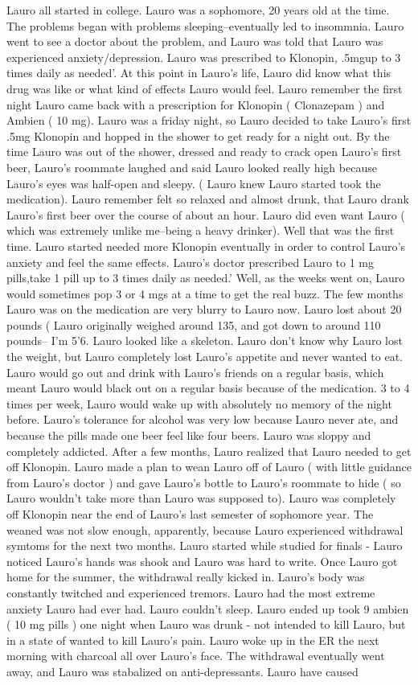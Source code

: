 \documentclass[12pt]{book}
\begin{document}
Lauro all started in college. Lauro was a sophomore, 20 years old at the time. The problems began with problems sleeping--eventually led to insommnia. Lauro went to see a doctor about the problem, and Lauro was told that Lauro was experienced anxiety/depression. Lauro was prescribed to Klonopin, .5mgup to 3 times daily as needed'. At this point in Lauro's life, Lauro did know what this drug was like or what kind of effects Lauro would feel. Lauro remember the first night Lauro came back with a prescription for Klonopin ( Clonazepam ) and Ambien ( 10 mg). Lauro was a friday night, so Lauro decided to take Lauro's first .5mg Klonopin and hopped in the shower to get ready for a night out. By the time Lauro was out of the shower, dressed and ready to crack open Lauro's first beer, Lauro's roommate laughed and said Lauro looked really high because Lauro's eyes was half-open and sleepy. ( Lauro knew Lauro started took the medication). Lauro remember felt so relaxed and almost drunk, that Lauro drank Lauro's first beer over the course of about an hour. Lauro did even want Lauro ( which was extremely unlike me--being a heavy drinker). Well that was the first time. Lauro started needed more Klonopin eventually in order to control Lauro's anxiety and feel the same effects. Lauro's doctor prescribed Lauro to 1 mg pills,take 1 pill up to 3 times daily as needed.' Well, as the weeks went on, Lauro would sometimes pop 3 or 4 mgs at a time to get the real buzz. The few months Lauro was on the medication are very blurry to Lauro now. Lauro lost about 20 pounds ( Lauro originally weighed around 135, and got down to around 110 pounds-- I'm 5'6. Lauro looked like a skeleton. Lauro don't know why Lauro lost the weight, but Lauro completely lost Lauro's appetite and never wanted to eat. Lauro would go out and drink with Lauro's friends on a regular basis, which meant Lauro would black out on a regular basis because of the medication. 3 to 4 times per week, Lauro would wake up with absolutely no memory of the night before. Lauro's tolerance for alcohol was very low because Lauro never ate, and because the pills made one beer feel like four beers. Lauro was sloppy and completely addicted. After a few months, Lauro realized that Lauro needed to get off Klonopin. Lauro made a plan to wean Lauro off of Lauro ( with little guidance from Lauro's doctor ) and gave Lauro's bottle to Lauro's roommate to hide ( so Lauro wouldn't take more than Lauro was supposed to). Lauro was completely off Klonopin near the end of Lauro's last semester of sophomore year. The weaned was not slow enough, apparently, because Lauro experienced withdrawal symtoms for the next two months. Lauro started while studied for finals - Lauro noticed Lauro's hands was shook and Lauro was hard to write. Once Lauro got home for the summer, the withdrawal really kicked in. Lauro's body was constantly twitched and experienced tremors. Lauro had the most extreme anxiety Lauro had ever had. Lauro couldn't sleep. Lauro ended up took 9 ambien ( 10 mg pills ) one night when Lauro was drunk - not intended to kill Lauro, but in a state of wanted to kill Lauro's pain. Lauro woke up in the ER the next morning with charcoal all over Lauro's face. The withdrawal eventually went away, and Lauro was stabalized on anti-depressants. Lauro have caused 
\end{document}
